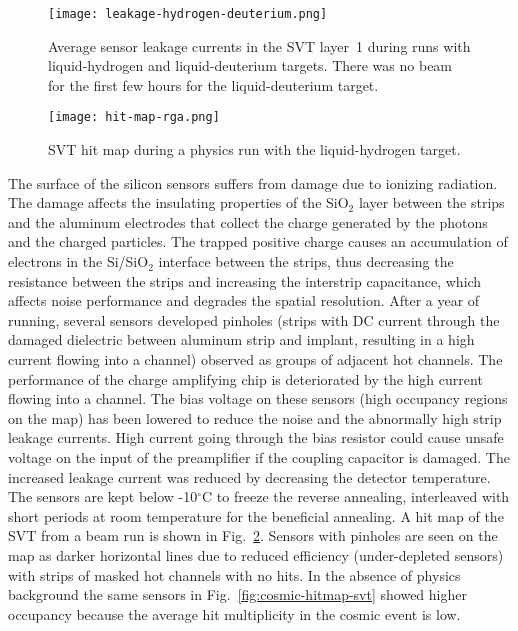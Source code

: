 \begin{figure}[hbt] 
\centering 
\texttt{[image: leakage-hydrogen-deuterium.png]}
\caption{Average sensor leakage currents in the SVT layer~1 during runs with liquid-hydrogen and liquid-deuterium
  targets. There was no beam for the first few hours for the liquid-deuterium target.}
\label{fig:leakage-hydrogen-deuterium}
\end{figure}

\begin{figure}[hbt] 
\centering 
\texttt{[image: hit-map-rga.png]}
\caption{SVT hit map during a physics run with the liquid-hydrogen target.}
\label{fig:hit-map-rga}
\end{figure}

The surface of the silicon sensors suffers from damage due to ionizing radiation. The damage affects the insulating
properties of the SiO$_2$ layer between the strips and the aluminum electrodes that collect the charge generated
by the photons and the charged particles. The trapped positive charge causes an accumulation of electrons in the
Si/SiO$_2$ interface between the strips, thus decreasing the resistance between the strips and increasing the
interstrip capacitance, which affects noise performance and degrades the spatial resolution. After a year of running,
several sensors developed pinholes (strips with DC current through the damaged dielectric between aluminum strip
and implant, resulting in a high current flowing into a channel) observed as groups of adjacent hot channels. The
performance of the charge amplifying chip is deteriorated by the high current flowing into a channel. The bias
voltage on these sensors (high occupancy regions on the map) has been lowered to reduce the noise and the
abnormally high strip leakage currents. High current going through the bias resistor could cause unsafe voltage on
the input of the preamplifier if the coupling capacitor is damaged. The increased leakage current was reduced by
decreasing the detector temperature. The sensors are kept below -10$^\circ$C to freeze the reverse annealing,
interleaved with short periods at room temperature for the beneficial annealing. A hit map of the SVT from a beam
run is shown in Fig.~\ref{fig:hit-map-rga}. Sensors with pinholes are seen on the map as darker horizontal lines due
to reduced efficiency (under-depleted sensors) with strips of masked hot channels with no hits. In the absence of
physics background the same sensors in Fig.~\ref{fig:cosmic-hitmap-svt} showed higher occupancy because the
average hit multiplicity in the cosmic event is low. 

